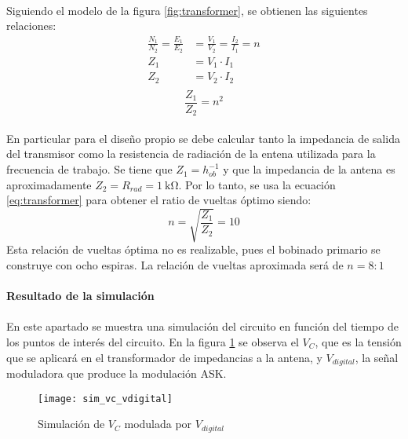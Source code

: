 \paragraph{}
Siguiendo el modelo de la figura \ref{fig:transformer}, se obtienen las siguientes relaciones:
\begin{align*}
   \frac{N_1}{N_2} = \frac{E_1}{E_2} &= \frac{V_1}{V_2} = \frac{I_2}{I_1} = n \\
   Z_1 &= V_1 \cdot I_1 \\
   Z_2 &= V_2 \cdot I_2 \\
\end{align*}
\begin{equation}
   \label{eq:transformer}
   \frac{Z_1}{Z_2} = n^2 
\end{equation}
\paragraph{}
En particular para el diseño propio se debe calcular tanto la impedancia de salida del transmisor como la resistencia de radiación de la entena utilizada para la frecuencia de trabajo.
Se tiene que $Z_1 = h_{ob}^{-1}$ y que la impedancia de la antena es aproximadamente $Z_2 = R_{rad} = \SI{1}{\kilo\ohm}$.
Por lo tanto, se usa la ecuaci\'on \ref{eq:transformer} para obtener el ratio de vueltas óptimo siendo: $$ n = \sqrt{\frac{Z_1}{Z_2}} = 10 $$
Esta relación de vueltas óptima no es realizable, pues el bobinado primario se construye con ocho espiras. La relación de vueltas aproximada será de $ n = 8:1 $


\paragraph{Resultado de la simulaci\'on} %
\paragraph{}
En este apartado se muestra una simulación del circuito en función del tiempo de los puntos de interés del circuito. 
En la figura \ref{fig:sim_vc_vdig} se observa el $V_C$, que es la tensión que se aplicará en el transformador de impedancias a la antena, y $V_{digital}$, la señal moduladora que produce la modulación ASK. 
\begin{figure}[h]
    \centering
    \texttt{[image: sim\_vc\_vdigital]}
    \caption{Simulaci\'on de $V_C$ modulada por $V_{digital}$}
    \label{fig:sim_vc_vdig}
\end{figure}
